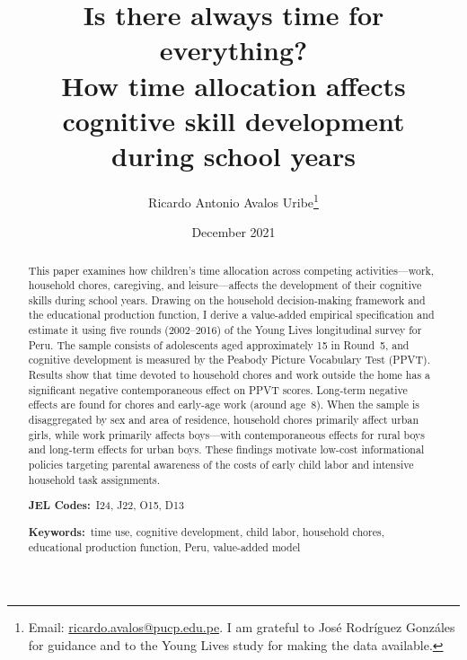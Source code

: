 \documentclass[12pt]{article}
\begin{document}

\title{\textbf{Is there always time for everything?}\\
       \large How time allocation affects cognitive skill development\\
       during school years}

\author{Ricardo Antonio Avalos Uribe\thanks{
  Email: \href{mailto:ricardo.avalos@pucp.edu.pe}{ricardo.avalos@pucp.edu.pe}.
  I am grateful to Jos\'{e} Rodr\'{i}guez Gonz\'{a}les for guidance and
  to the Young Lives study for making the data available.}}

\date{December 2021}

\maketitle
\thispagestyle{empty}

\begin{abstract}
\noindent
This paper examines how children's time allocation across competing
activities—work, household chores, caregiving, and leisure—affects the
development of their cognitive skills during school years. Drawing on the
household decision-making framework and the educational production function,
I derive a value-added empirical specification and estimate it using five
rounds (2002–2016) of the Young Lives longitudinal survey for Peru.
The sample consists of adolescents aged approximately 15 in Round~5, and
cognitive development is measured by the Peabody Picture Vocabulary Test
(PPVT). Results show that time devoted to household chores and work outside
the home has a significant negative contemporaneous effect on PPVT scores.
Long-term negative effects are found for chores and early-age work (around
age~8). When the sample is disaggregated by sex and area of residence,
household chores primarily affect urban girls, while work primarily affects
boys—with contemporaneous effects for rural boys and long-term effects for
urban boys. These findings motivate low-cost informational policies targeting
parental awareness of the costs of early child labor and intensive household
task assignments.

\medskip
\noindent\textbf{JEL Codes:}~I24, J22, O15, D13

\noindent\textbf{Keywords:}~time use, cognitive development, child labor,
household chores, educational production function, Peru, value-added model
\end{abstract}
\end{document}
